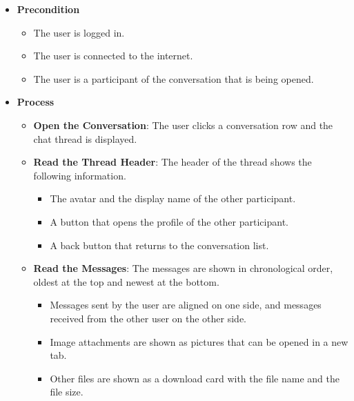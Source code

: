\begin{itemize}[leftmargin=1.6em,topsep=4pt,itemsep=3pt,parsep=0pt,label=$\bullet$]
    \item \textbf{Precondition}

        \begin{itemize}[leftmargin=2.2em,topsep=2pt,itemsep=3pt,parsep=0pt,label=$\circ$]
            \item The user is logged in.
            \item The user is connected to the internet.
            \item The user is a participant of the conversation that is being opened.
        \end{itemize}
    \item \textbf{Process}

        \begin{itemize}[leftmargin=2.2em,topsep=2pt,itemsep=3pt,parsep=0pt,label=$\circ$]
            \item \textbf{Open the Conversation}: The user clicks a conversation row and the chat thread is displayed.
            \item \textbf{Read the Thread Header}: The header of the thread shows the following information.
                \begin{itemize}[leftmargin=2.2em,topsep=2pt,itemsep=3pt,parsep=0pt,label=$\blacksquare$]
                    \item The avatar and the display name of the other participant.
                    \item A button that opens the profile of the other participant.
                    \item A back button that returns to the conversation list.
                \end{itemize}
            \item \textbf{Read the Messages}: The messages are shown in chronological order, oldest at the top and newest at the bottom.
                \begin{itemize}[leftmargin=2.2em,topsep=2pt,itemsep=3pt,parsep=0pt,label=$\blacksquare$]
                    \item Messages sent by the user are aligned on one side, and messages received from the other user on the other side.
                    \item Image attachments are shown as pictures that can be opened in a new tab.
                    \item Other files are shown as a download card with the file name and the file size.

\end{itemize}
\end{itemize}
\end{itemize}
